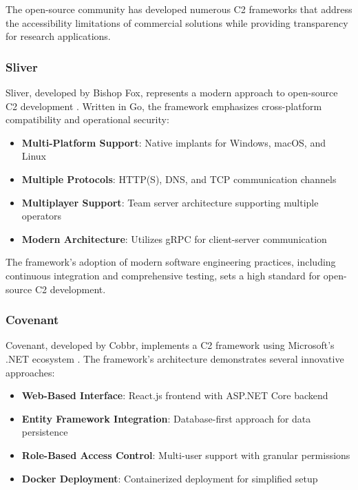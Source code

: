 The open-source community has developed numerous C2 frameworks that address the accessibility limitations of commercial solutions while providing transparency for research applications.

\subsubsection{Sliver}

Sliver, developed by Bishop Fox, represents a modern approach to open-source C2 development \cite{bishopfox2022sliver}. Written in Go, the framework emphasizes cross-platform compatibility and operational security:

\begin{itemize}
\item \textbf{Multi-Platform Support}: Native implants for Windows, macOS, and Linux
\item \textbf{Multiple Protocols}: HTTP(S), DNS, and TCP communication channels
\item \textbf{Multiplayer Support}: Team server architecture supporting multiple operators
\item \textbf{Modern Architecture}: Utilizes gRPC for client-server communication
\end{itemize}

The framework's adoption of modern software engineering practices, including continuous integration and comprehensive testing, sets a high standard for open-source C2 development.

\subsubsection{Covenant}

Covenant, developed by Cobbr, implements a C2 framework using Microsoft's .NET ecosystem \cite{cobbr2019covenant}. The framework's architecture demonstrates several innovative approaches:

\begin{itemize}
\item \textbf{Web-Based Interface}: React.js frontend with ASP.NET Core backend
\item \textbf{Entity Framework Integration}: Database-first approach for data persistence
\item \textbf{Role-Based Access Control}: Multi-user support with granular permissions
\item \textbf{Docker Deployment}: Containerized deployment for simplified setup
\end{itemize}

